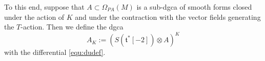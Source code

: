 \documentclass[a4paper]{amsart}
\theoremstyle{plain}
\theoremstyle{definition}
\newcommand{\alg}[1]{\mathfrak{{#1}}}
\begin{document}
% 
% 

To this end, suppose that $A\subset \Omega_{PA}(M)$ is a sub-dgca of smooth forms closed under the action of $K$ and under the contraction with the vector fields generating the $T$-action.
Then we define the dgca
\[
A_K := (S(\alg t^*[-2])\otimes A)^K
\]
with the differential \eqref{equ:dudef}.
\end{document}

